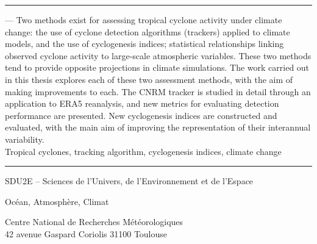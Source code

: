 \documentclass[../main.tex]{subfiles}
\begin{document}
\vspace{5mm}
\noindent\rule[2pt]{\textwidth}{0.5pt}
 --- Two methods exist for assessing tropical cyclone activity under climate change: the use of cyclone detection
algorithms (trackers) applied to climate models, and the use of cyclogenesis indices; statistical relationships linking observed cyclone activity to large-scale
atmospheric variables. These two methods tend to provide opposite projections in climate simulations. The work carried out in this thesis explores each of these
two assessment methods, with the aim of making improvements to each. The CNRM tracker is studied in detail through an application to ERA5 reanalysis, and new
metrics for evaluating detection performance are presented. New cyclogenesis indices are constructed and evaluated, with the main aim of improving the
representation of their interannual variability.\\
    Tropical cyclones, tracking algorithm, cyclogenesis indices, climate change
\\
\noindent\rule[2pt]{\textwidth}{0.5pt}

\vspace{1cm}
SDU2E -- Sciences de l'Univers, de l'Environnement et de l'Espace

Océan, Atmosphère, Climat

\vspace{5mm}
\begin{center}
  Centre National de Recherches Météorologiques\\
  42 avenue Gaspard Coriolis 31100 Toulouse
\end{center}
\end{document}
